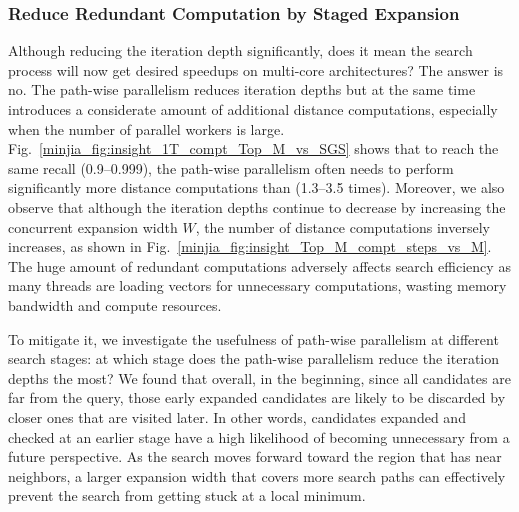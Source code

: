 \subsubsection{Reduce Redundant Computation by Staged Expansion}
\label{minjia_subsec:staged-expansion}

Although reducing the iteration depth significantly, does it mean the search process will now get desired speedups on multi-core architectures? The answer is no. The path-wise parallelism reduces iteration depths but at the same time introduces a considerate amount of additional distance computations, especially when the number of parallel workers is large. 
Fig.~\ref{minjia_fig:insight_1T_compt_Top_M_vs_SGS} shows that to reach the same recall (0.9--0.999), the path-wise parallelism often needs to perform significantly more distance computations than \SeqShortName (1.3--3.5 times). Moreover, we also observe that although the iteration depths continue to decrease by increasing the concurrent expansion width $W$, the number of distance computations inversely increases, as shown in Fig.~\ref{minjia_fig:insight_Top_M_compt_steps_vs_M}. 
The huge amount of redundant computations adversely affects search efficiency as many threads are loading vectors for unnecessary computations, wasting memory bandwidth and compute resources. 

To mitigate it, we investigate the usefulness of path-wise parallelism at different search stages: at which stage does the path-wise parallelism reduce the iteration depths the most? 
We found that overall, in the beginning, since all candidates are far from the query, those early expanded candidates are likely to be discarded by closer ones that are visited later. In other words, candidates expanded and checked at an earlier stage have a high likelihood of becoming unnecessary from a future perspective. As the search moves forward toward the region that has near neighbors, a larger expansion width that covers more search paths can effectively prevent the search from getting stuck at a local minimum.

